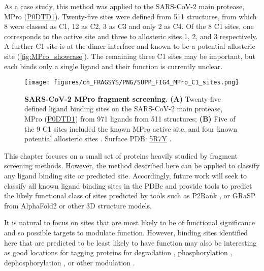 As a case study, this method was applied to the SARS-CoV-2 main protease, MPro (\href{https://www.uniprot.org/uniprotkb/P0DTD1/entry}{P0DTD1}). Twenty-five sites were defined from 511 structures, from which 8 were classed as C1, 12 as C2, 3 as C3 and only 2 as C4. Of the 8 C1 sites, one corresponds to the active site and three to allosteric sites 1, 2, and 3 \cite{DASGUPTA_2022_ALLOSTERIC} respectively. A further C1 site is at the dimer interface and known to be a potential allosteric site \cite{DOUANGAMATH_2020_SARSCOV2} (\autoref{fig:MPro_showcase}). The remaining three C1 sites may be important, but each binds only a single ligand and their function is currently unclear.

\begin{figure}[htb!]
    \centering
    \texttt{[image: figures/ch\_FRAGSYS/PNG/SUPP\_FIG4\_MPro\_C1\_sites.png]}
    \caption[SARS-CoV-2 MPro fragment screening]{\textbf{SARS-CoV-2 MPro fragment screening.} \textbf{(A)} Twenty-five defined ligand binding sites on the SARS-CoV-2 main protease, MPro (\href{https://www.uniprot.org/uniprotkb/P0DTD1/entry}{P0DTD1}) from 971 ligands from 511 structures; \textbf{(B)} Five of the 9 C1 sites included the known MPro active site, and four known potential allosteric sites \cite{DOUANGAMATH_2020_SARSCOV2, DASGUPTA_2022_ALLOSTERIC}. Surface PDB: \href{https://www.ebi.ac.uk/pdbe/entry/pdb/5R7Y}{5R7Y} \cite{DOUANGAMATH_2020_SARSCOV2}.}
    \label{fig:MPro_showcase}
\end{figure}

This chapter focuses on a small set of proteins heavily studied by fragment screening methods. However, the method described here can be applied to classify any ligand binding site or predicted site. Accordingly, future work will seek to classify all known ligand binding sites in the PDBe and provide tools to predict the likely functional class of sites predicted by tools such as P2Rank \cite{KRIVAK_2018_P2RANK}, or GRaSP \cite{SANTANA_2020_GRaSP, SANTANA_2022_GRaSP} from AlphaFold2 \cite{JUMPER_2021_ALPHAFOLD, VARADI_2022_ALPHAFOLDDB} or other 3D structure models.

It is natural to focus on sites that are most likely to be of functional significance and so possible targets to modulate function. However, binding sites identified here that are predicted to be least likely to have function may also be interesting as good locations for tagging proteins for degradation \cite{BEKES_2022_PROTACS}, phosphorylation \cite{SIRIWARDENA_2020_PHOSPHO}, dephosphorylation \cite{SIMPSON_2023_ADPROM}, or other modulation \cite{HEITEL_2023_PTMS, PENG_2023_PTMS}.

